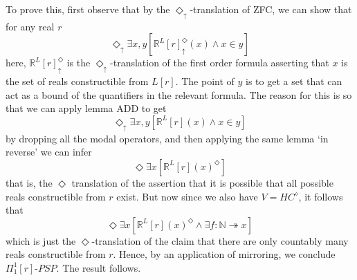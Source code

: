 \documentclass{article}
\theoremstyle{definition}
\newcommand{\du}{\Diamond_\uparrow}
\begin{document}
To prove this, first observe that by the $\du$-translation of ZFC, we can show that for any real $r$
\begin{equation}
    \du \exists x, y[\mathbb{R}^L[r]^\du(x) \wedge x \in y]
\end{equation}
here, $\mathbb{R}^L[r]^\du$ is the $\du$-translation of the first order formula asserting that $x$ 
is the set of reals constructible from $L[r]$. The point of $y$ is to get a set that can act as a 
bound of the quantifiers in the relevant formula. The reason for this is so that we can apply lemma 
ADD to get 
\begin{equation}
    \du \exists x, y[\mathbb{R}^L[r](x) \wedge x \in y]
\end{equation}
by dropping all the modal operators, and then applying the same lemma `in reverse' we can infer
\begin{equation}
    \Diamond \exists x[\mathbb{R}^L[r](x)^\Diamond]
\end{equation}
that is, the $\Diamond$ translation of the assertion that it is possible that all possible 
reals constructible from $r$ exist. But now since we also have $V = HC^\diamond$, it follows that 
\begin{equation}
    \Diamond \exists x[\mathbb{R}^L[r](x)^\Diamond \wedge \exists f : \mathbb{N} \twoheadrightarrow x]
\end{equation}
which is just the $\Diamond$-translation of the claim that there are only countably many 
reals constructible from $r$. Hence, by an application of mirroring, we conclude $\Pi_1^1[r]$-$PSP$.
The result follows.
\end{document}

